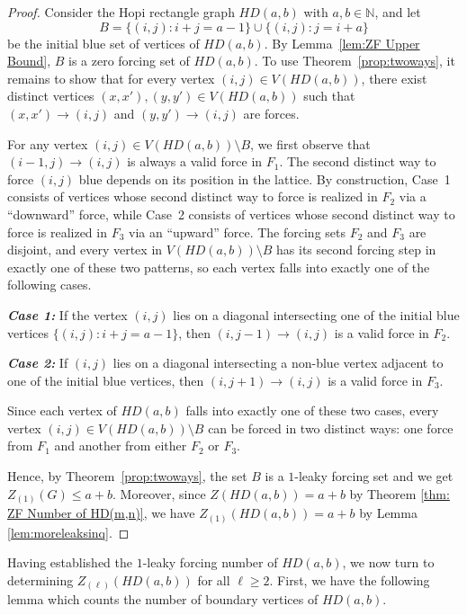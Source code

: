 \documentclass[11pt]{article}
\theoremstyle{plain} \newtheorem{question}{Question}
\newtheorem{cor}[thm]{Corollary}
\theoremstyle{definition}
\begin{document}
\begin{proof}

Consider the Hopi rectangle graph $HD(a,b)$ with $a,b \in \mathbb{N}$, and let  
\[
B = \{(i,j): i + j = a - 1\}\cup\{(i,j): j = i + a\}
\]  
be the initial blue set of vertices of $HD(a,b)$. By Lemma~\ref{lem:ZF Upper Bound}, $B$ is a zero forcing set of $HD(a,b)$. To use Theorem~\ref{prop:twoways}, it remains to show that for every vertex $(i,j) \in V(HD(a,b))$, there exist distinct vertices $(x,x'),(y,y') \in V(HD(a,b))$ such that $(x,x') \to (i,j)$ and $(y,y') \to (i,j)$ are forces.

For any vertex $(i,j)\in V(HD(a,b)) \setminus B$, we first observe that $(i-1,j)\to(i,j)$ 
is always a valid force in $F_1$. The second distinct way to force $(i,j)$ blue depends on its position in the lattice. By construction, Case~1 consists of vertices whose second distinct way to force is realized in $F_2$ via a ``downward'' force, while Case~2 consists of vertices whose second distinct way to force is realized in $F_3$ via an ``upward'' force. The forcing sets $F_2$ and $F_3$ are disjoint, and every vertex in $V(HD(a,b))\setminus B$ has its second forcing step in exactly one of these two patterns, so each vertex falls into exactly one of the following cases.


\textbf{\textit{Case 1:}} If the vertex $(i,j)$ lies on a diagonal intersecting one of the initial blue vertices $\{(i,j): i+j=a-1\}$, then $(i,j-1)\to(i,j)$ is a valid force in $F_2$. 
    
\textbf{\textit{Case 2:}} If $(i,j)$ lies on a diagonal intersecting a non-blue vertex adjacent to one of the initial blue vertices, then $(i,j+1)\to(i,j)$ is a valid force in $F_3$.  


Since each vertex of $HD(a,b)$ falls into exactly one of these two cases, every vertex 
$(i,j)\in V(HD(a,b))\setminus B$ can be forced in two distinct ways: one force from $F_1$ 
and another from either $F_2$ or $F_3$. 

Hence, by Theorem~\ref{prop:twoways}, the set $B$ is a $1$-leaky forcing set and we get
$Z_{(1)}(G) \leq a+b$. Moreover, since $Z(HD(a,b)) = a+b$ by Theorem \ref{thm: ZF Number of HD(m,n)}, we have $Z_{(1)}(HD(a,b)) = a+b$ by Lemma \ref{lem:moreleaksinq}.
\end{proof}


Having established the $1$-leaky forcing number of $HD(a,b)$, we now turn to determining $Z_{(\ell)}(HD(a,b))$ for all $\ell \ge 2$. First, we have the following lemma which counts the number of boundary vertices of $HD(a,b)$. 
\end{document}
